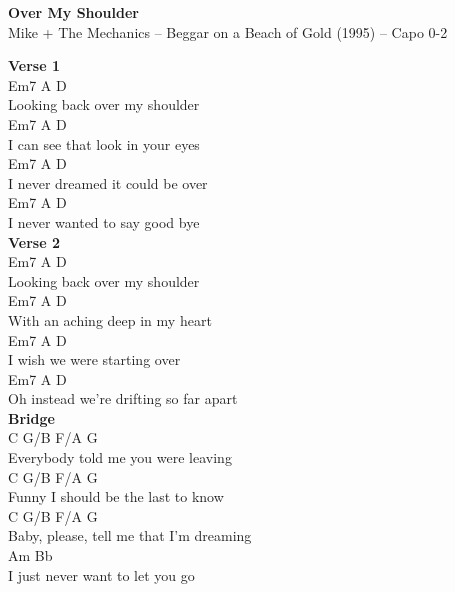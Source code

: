 \documentclass[a4paper]{article}
\begin{document}
    \begin{center}
        \textbf{Over My Shoulder}
        ~\\
        Mike + The Mechanics -- Beggar on a Beach of Gold (1995)
         -- Capo 0-2
    \end{center}
    {
        \scriptsize
        \textbf{Verse 1}
        ~\\
        {
            \cutive
            \obeyspaces
        Em7  A       D
\\
Looking back over my shoulder
\\
Em7            A            D
\\
I can see that look in your eyes
\\
Em7             A           D
\\
I never dreamed it could be over
\\
Em7           A            D
\\
I never wanted to say good bye
\\

        }
        \textbf{Verse 2}
        ~\\
        {
            \cutive
            \obeyspaces
        Em7  A       D
\\
Looking back over my shoulder
\\
Em7            A          D
\\
With an aching deep in my heart
\\
Em7       A             D
\\
I wish we were starting over
\\
Em7                       A      D
\\
Oh instead we're drifting so far apart
\\

        }
        \textbf{Bridge}
        ~\\
        {
            \cutive
            \obeyspaces
C      G/B  F/A              G
\\
  Everybody told me you were leaving
\\
C       G/B      F/A            G
\\
  Funny I should be the last to know
\\
C       G/B     F/A              G
\\
  Baby, please, tell me that I'm dreaming
\\
Am                           Bb
\\
I just never want to let you go
\\

}}
\end{document}
